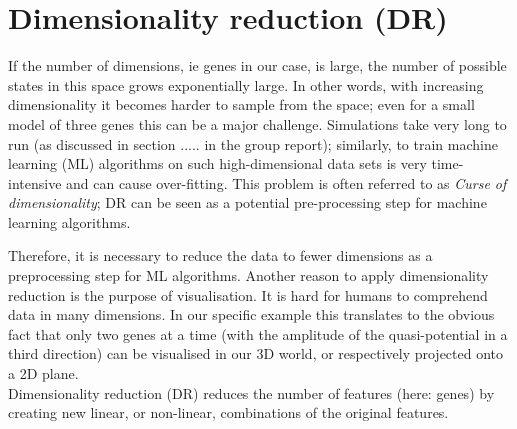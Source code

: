 \documentclass[journal, a4paper]{IEEEtran}
\begin{document}

\section{Dimensionality reduction (DR)}



If the number of dimensions, ie genes in our case, is large, the number of possible states in this space grows exponentially large. In other words, with increasing dimensionality it becomes harder to sample from the space; even for a small model of three genes this can be a major challenge. Simulations take very long to run (as discussed in section ..... in the group report); similarly, to train machine learning (ML) algorithms on such high-dimensional data sets is very time-intensive and can cause over-fitting. %
This problem is often referred to as \textit{Curse of dimensionality}; DR can be seen as a potential pre-processing step for machine learning algorithms.

Therefore, it is necessary to reduce the data to fewer dimensions as a preprocessing step for ML algorithms.
Another reason to apply dimensionality reduction is the purpose of visualisation. It is hard for humans to comprehend data in many dimensions. In our specific example this translates to the obvious fact that only two genes at a time (with the amplitude of the quasi-potential in a third direction) can be visualised in our 3D world, or respectively projected onto a 2D plane.\\

Dimensionality reduction (DR) reduces the number of features (here: genes) by creating new linear, or non-linear, combinations of the original features.

\end{document}
